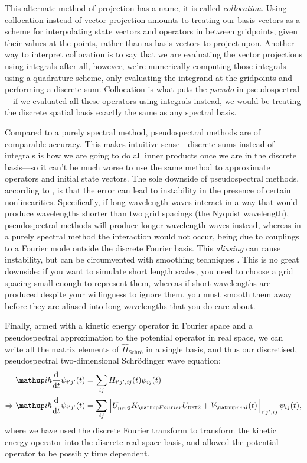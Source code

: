 This alternate method of projection has a name, it is called \emph{collocation}\cite[p.~227]{tannor_introduction_2007}. Using collocation instead of vector projection amounts to treating our basis vectors as a scheme for interpolating state vectors and operators in between gridpoints, given their values at the points, rather than as basis vectors to project upon. Another way to interpret collocation is to say that we are evaluating the vector projections using integrals after all, however, we're numerically computing those integrals using a quadrature scheme, only evaluating the integrand at the gridpoints and performing a discrete sum\cite[p.~283]{tannor_introduction_2007}. Collocation is what puts the \emph{pseudo} in pseudospectral---if we evaluated all these operators using integrals instead, we would be treating the discrete spatial basis exactly the same as any spectral basis. 

Compared to a purely spectral method, pseudospectral methods are of comparable accuracy\cite{orszag_comparison_1972}. This makes intuitive sense---discrete sums instead of integrals is how we are going to do all inner products once we are in the discrete basis---so it can't be much worse to use the same method to approximate operators and initial state vectors. The sole downside of pseudospectral methods, according to \cite{orszag_comparison_1972}, is that the error can lead to instability in the presence of certain nonlinearities. Specifically, if long wavelength waves interact in a way that would produce wavelengths shorter than two grid spacings (the Nyquist wavelength), pseudospectral methods will produce longer wavelength waves instead, whereas in a purely spectral method the interaction would not occur, being due to couplings to a Fourier mode outside the discrete Fourier basis. This \emph{aliasing} can cause instability, but can be circumvented with smoothing techniques \cite{phillips_example_1959}. This is no great downside: if you want to simulate short length scales, you need to choose a grid spacing small enough to represent them, whereas if short wavelengths are produced despite your willingness to ignore them, you must smooth them away before they are aliased into long wavelengths that you do care about.

Finally, armed with a kinetic energy operator in Fourier space and a pseudospectral approximation to the potential operator in real space, we can write all the matrix elements of $\hat H_\textrm{Schr\"o}$ in a single basis, and thus our discretised, pseudospectral two-dimensional Schr\"odinger wave equation:
\begin{align}
\ii\hbar\dv{t}\psi_{i^\prime j^\prime}(t) &= \sum_{ij} H_{i^\prime j^\prime, ij}(t) \psi_{ij}(t)\\
\Rightarrow \ii\hbar\dv{t}\psi_{i^\prime j^\prime}(t) &=\sum_{ij}
\left[
U^\dagger_{\textsc{dft2}}K_\up{Fourier}U_{\textsc{dft2}}
 + V_\up{real}(t)
\right]_{i^\prime j^\prime, ij}\psi_{ij}(t),
\end{align}
where we have used the discrete Fourier transform to transform the kinetic energy operator into the discrete real space basis, and allowed the potential operator to be possibly time dependent.

